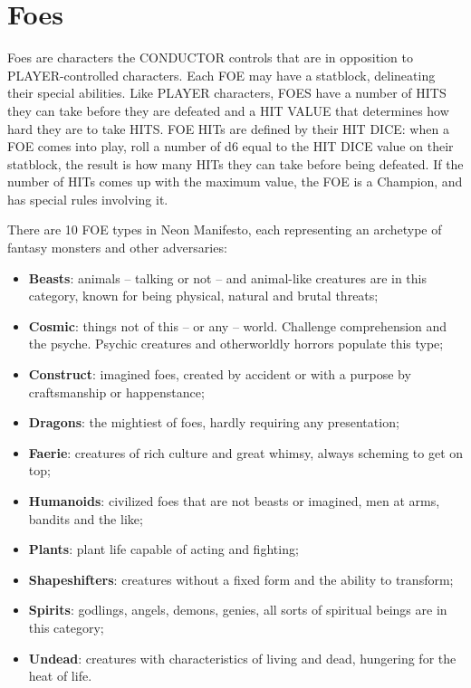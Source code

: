 \newpage
\section{Foes}
Foes are characters the CONDUCTOR controls that are in opposition to PLAYER-controlled characters. Each FOE may have a statblock, delineating their special abilities. Like PLAYER characters, FOES have a number of HITS they can take before they are defeated and a HIT VALUE that determines how hard they are to take HITS. FOE HITs are defined by their HIT DICE: when a FOE comes into play, roll a number of d6 equal to the HIT DICE value on their statblock, the result is how many HITs they can take before being defeated. If the number of HITs comes up with the maximum value, the FOE is a Champion, and has special rules involving it.

There are 10 FOE types in Neon Manifesto, each representing an archetype of fantasy monsters and other adversaries:
\begin{itemize}
    \item {\textbf{Beasts}: animals -- talking or not -- and animal-like creatures are in this category, known for being physical, natural and brutal threats;}
    \item {\textbf{Cosmic}: things not of this -- or any -- world. Challenge comprehension and the psyche. Psychic creatures and otherworldly horrors populate this type;}
    \item {\textbf{Construct}: imagined foes, created by accident or with a purpose by craftsmanship or happenstance;}
    \item {\textbf{Dragons}: the mightiest of foes, hardly requiring any presentation;}
    \item {\textbf{Faerie}: creatures of rich culture and great whimsy, always scheming to get on top;}
    \item {\textbf{Humanoids}: civilized foes that are not beasts or imagined, men at arms, bandits and the like;}
    \item {\textbf{Plants}: plant life capable of acting and fighting;}
    \item {\textbf{Shapeshifters}: creatures without a fixed form and the ability to transform;}
    \item {\textbf{Spirits}: godlings, angels, demons, genies, all sorts of spiritual beings are in this category;}
    \item {\textbf{Undead}: creatures with characteristics of living and dead, hungering for the heat of life.}
\end{itemize}

